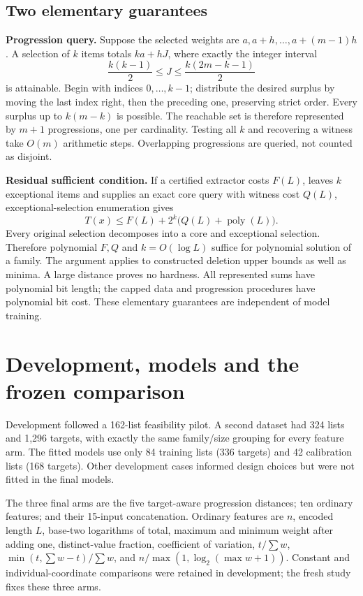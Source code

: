 \documentclass[10pt,english]{article}
\newcommand{\poly}{\operatorname{poly}}
\begin{document}
\subsection{Two elementary guarantees}
\textbf{Progression query.} Suppose the selected weights are \(a,a+h,\ldots,a+(m-1)h\). A selection of \(k\) items totals \(ka+hJ\), where exactly the integer interval
\[
\frac{k(k-1)}2\le J\le\frac{k(2m-k-1)}2
\]
is attainable. Begin with indices \(0,\ldots,k-1\); distribute the desired surplus by moving the last index right, then the preceding one, preserving strict order. Every surplus up to \(k(m-k)\) is possible. The reachable set is therefore represented by \(m+1\) progressions, one per cardinality. Testing all \(k\) and recovering a witness take \(O(m)\) arithmetic steps. Overlapping progressions are queried, not counted as disjoint.

\textbf{Residual sufficient condition.} If a certified extractor costs \(F(L)\), leaves \(k\) exceptional items and supplies an exact core query with witness cost \(Q(L)\), exceptional-selection enumeration gives
\[
T(x)\le F(L)+2^k\bigl(Q(L)+\poly(L)\bigr).
\]
Every original selection decomposes into a core and exceptional selection. Therefore polynomial \(F,Q\) and \(k=O(\log L)\) suffice for polynomial solution of a family. The argument applies to constructed deletion upper bounds as well as minima. A large distance proves no hardness. All represented sums have polynomial bit length; the capped data and progression procedures have polynomial bit cost. These elementary guarantees are independent of model training.

\section{Development, models and the frozen comparison}
Development followed a 162-list feasibility pilot. A second dataset had 324 lists and 1,296 targets, with exactly the same family/size grouping for every feature arm. The fitted models use only 84 training lists (336 targets) and 42 calibration lists (168 targets). Other development cases informed design choices but were not fitted in the final models.

The three final arms are the five target-aware progression distances; ten ordinary features; and their 15-input concatenation. Ordinary features are \(n\), encoded length \(L\), base-two logarithms of total, maximum and minimum weight after adding one, distinct-value fraction, coefficient of variation, \(t/\sum w\), \(\min(t,\sum w-t)/\sum w\), and \(n/\max(1,\log_2(\max w+1))\). Constant and individual-coordinate comparisons were retained in development; the fresh study fixes these three arms.
\end{document}
